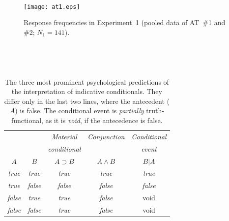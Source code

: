 \documentclass[11pt]{article}
\begin{document}
 \newpage

~


\begin{figure}
\begin{center}
\texttt{[image: at1.eps]}
\end{center}
\caption{\label{at1} Response frequencies in Experiment~1 (pooled data
  of AT~\#1 and \#2; $N_1=141$).}
\end{figure}

~

 \newpage

~



\begin{table}
\begin{center}
\begin{tabular}{ccccc}\hline\hline
\multicolumn{2}{c}{\em} & \em Material  &\em Conjunction&\em Conditional \\
\multicolumn{2}{c}{\em} & \em conditional  &&\em event\\

$A$ & $B$ & $A \supset B$ & $A \wedge B$ & $B|A$ \\\hline
 {\it true} & {\it true}&   {\it true} &{\it true}   &   {\it true} \\
 {\it true} & {\it false}&   {\it false} & {\it false}   &   {\it false} \\
 {\it false} & {\it true}&   {\it true} & {\it false}   &   {void} \\
 {\it false} & {\it false}&   {\it true} & {\it false}   &  {void} \\ \hline\hline
\end{tabular}
\end{center}
\caption{\label{tt} The three most prominent psychological predictions
  of the interpretation of indicative conditionals. They differ only
  in the last two lines, where the antecedent ($A$) is false. The
  conditional event is \emph{partially} truth-functional, as it is
  \emph{void}, if the antecedence is false.}
\end{table}

~

 \newpage

~
\end{document}
